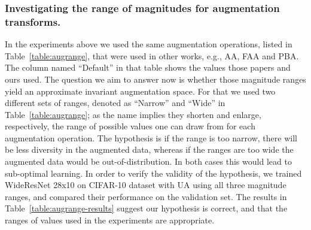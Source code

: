\documentclass[runningheads]{llncs}
\begin{document}
	
	\subsubsection{Investigating the range of magnitudes for augmentation transforms.}
	
	In the experiments above we used the same augmentation operations, listed in Table~\ref{table:augrange}, that were used in other works, e.g., AA, FAA and PBA. 
	The column named ``Default'' in that table shows the values those papers and ours used.  The question we aim to answer now is whether those magnitude ranges yield an approximate invariant augmentation space.  For that we used two different sets of ranges, denoted as ``Narrow'' and ``Wide'' in Table~\ref{table:augrange}; as the name implies they shorten and enlarge, respectively, the range of possible values one can draw from for each augmentation operation.  The hypothesis is
	if the range is too narrow, there will be less diversity in the augmented data, whereas if the ranges are too wide the augmented data would be out-of-distribution.  In both cases this would lead to sub-optimal learning.
In order to verify the validity of the hypothesis, we trained WideResNet 28x10 on CIFAR-10 dataset with UA using all three magnitude ranges, and compared their performance on the validation set. The results in Table~\ref{table:augrange-results} suggest our hypothesis is correct, and that the ranges of values used in the experiments are appropriate.
\end{document}
